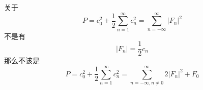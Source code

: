\documentclass[a4paper]{ctexart}
\begin{document}
关于
$$
P=c_0^2 + \frac{1}{2}\sum_{n=1}^\infty c_n^2 = \sum_{n = - \infty}^\infty
\vert F_n \vert ^2
$$
不是有
$$
\vert F_n \vert = \frac{1}{2}c_n
$$
那么不该是
$$
P=c_0^2 + \frac{1}{2}\sum_{n=1}^\infty c_n^2 = \sum_{n = - \infty,n \neq
0}^\infty 2\vert F_n \vert ^2 +F_0
$$
\end{document}

